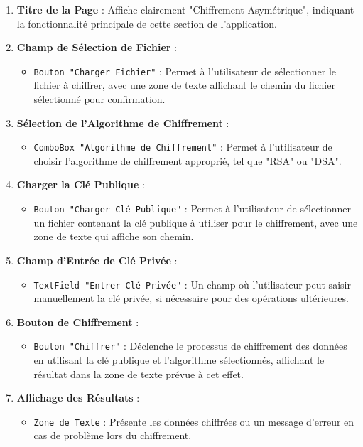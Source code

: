 \documentclass[a4paper,12pt]{report}
\begin{document}
\begin{enumerate}
	\item \textbf{Titre de la Page} : Affiche clairement "Chiffrement Asymétrique", indiquant la fonctionnalité principale de cette section de l'application.
	
	\item \textbf{Champ de Sélection de Fichier} : 
	\begin{itemize}
		\item \texttt{Bouton "Charger Fichier"} : Permet à l'utilisateur de sélectionner le fichier à chiffrer, avec une zone de texte affichant le chemin du fichier sélectionné pour confirmation.
	\end{itemize}
	
	\item \textbf{Sélection de l'Algorithme de Chiffrement} : 
	\begin{itemize}
		\item \texttt{ComboBox "Algorithme de Chiffrement"} : Permet à l'utilisateur de choisir l'algorithme de chiffrement approprié, tel que "RSA" ou "DSA".
	\end{itemize}
	
	\item \textbf{Charger la Clé Publique} : 
	\begin{itemize}
		\item \texttt{Bouton "Charger Clé Publique"} : Permet à l'utilisateur de sélectionner un fichier contenant la clé publique à utiliser pour le chiffrement, avec une zone de texte qui affiche son chemin.
	\end{itemize}
	
	\item \textbf{Champ d'Entrée de Clé Privée} : 
	\begin{itemize}
		\item \texttt{TextField "Entrer Clé Privée"} : Un champ où l'utilisateur peut saisir manuellement la clé privée, si nécessaire pour des opérations ultérieures.
	\end{itemize}
	
	\item \textbf{Bouton de Chiffrement} : 
	\begin{itemize}
		\item \texttt{Bouton "Chiffrer"} : Déclenche le processus de chiffrement des données en utilisant la clé publique et l'algorithme sélectionnés, affichant le résultat dans la zone de texte prévue à cet effet.
	\end{itemize}
	
	\item \textbf{Affichage des Résultats} : 
	\begin{itemize}
		\item \texttt{Zone de Texte} : Présente les données chiffrées ou un message d'erreur en cas de problème lors du chiffrement.
	\end{itemize}
\end{enumerate}
\end{document}
